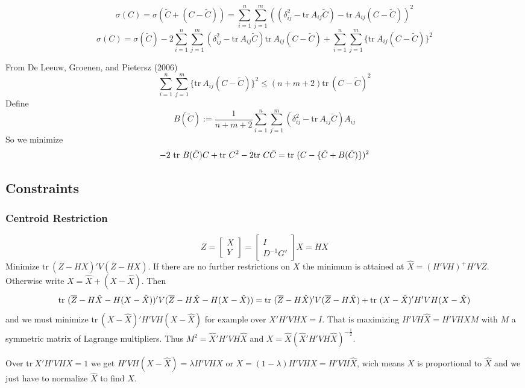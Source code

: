 \documentclass[
  12pt,
]{article}
\begin{document}
\[
\sigma(C)=\sigma(\tilde C+(C-\tilde C))=\sum_{i=1}^n\sum_{j=1}^m((\delta_{ij}^2-\text{tr}\ A_{ij}\tilde C)-\text{tr}\ A_{ij}(C-\tilde C))^2
\]
\[
\sigma(C)=\sigma(\tilde C)-2\sum_{i=1}^n\sum_{j=1}^m(\delta_{ij}^2-\text{tr}\ A_{ij}\tilde C)\text{tr}\ A_{ij}(C-\tilde C)+\sum_{i=1}^n\sum_{j=1}^m\{\text{tr}\ A_{ij}(C-\tilde C)\}^2
\]

From De Leeuw, Groenen, and Pietersz (2006)
\[
\sum_{i=1}^n\sum_{j=1}^m\{\text{tr}\ A_{ij}(C-\tilde C)\}^2\leq (n+m+2)\text{tr}\ (C-\tilde C)^2
\]
Define
\[
B(\tilde C):=\frac{1}{n+m+2}\sum_{i=1}^n\sum_{j=1}^m(\delta_{ij}^2-\text{tr}\ A_{ij}\tilde C)A_{ij}
\]
So we minimize
\[
-2\ \text{tr}\ B(\tilde C)C+\text{tr}\ C^2-2\text{tr}\ C\tilde C=\\
\text{tr}\ (C-\{\tilde C + B(\tilde C)\})^2
\]

\subsection{Constraints}\label{constraints-1}

\subsubsection{Centroid Restriction}\label{centroid-restriction}

\[
Z=\begin{bmatrix}
X\\Y
\end{bmatrix}=
\begin{bmatrix}
I\\
D^{-1}G'
\end{bmatrix}X=HX
\]
Minimize \(\text{tr}\ (\overline{Z}-HX)'V(\overline{Z}-HX)\). If there are
no further restrictions on \(X\) the minimum is attained at \(\hat X=(H'VH)^+H'V\overline{Z}\).
Otherwise write \(X=\hat X+(X-\hat X)\). Then
\[
\text{tr}\ (\overline{Z}-H\hat X-H(X-\hat X))'V(\overline{Z}-H\hat X-H(X-\hat X))=\\
\text{tr}\ (\overline{Z}-H\hat X)'V(\overline{Z}-H\hat X)+
\text{tr}\ (X-\hat X)'H'VH(X-\hat X)
\]
and we must minimize \(\text{tr}\ (X-\hat X)'H'VH(X-\hat X)\) for example over \(X'H'VHX=I\).
That is maximizing \(H'VH\hat X=H'VHXM\) with \(M\) a symmetric matrix of Lagrange multipliers.
Thus \(M^2=\hat X'H'VH\hat X\) and \(X=\hat X(\hat X'H'VH\hat X)^{-\frac12}\).

Over \(\text{tr}\ X'H'VHX=1\) we get \(H'VH(X-\hat X)=\lambda H'VHX\) or
\(X=(1-\lambda)H'VHX=H'VH\hat X\), wich means \(X\) is proportional to \(\hat X\) and we just have to normalize \(\hat X\) to find \(X\).
\end{document}
